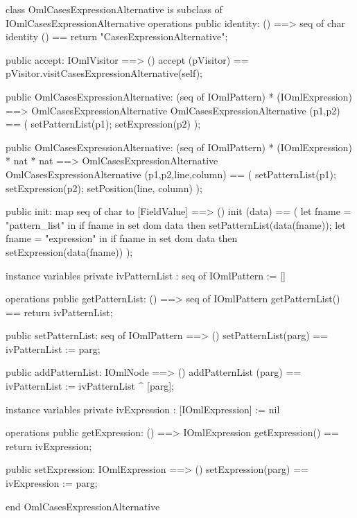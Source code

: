 \begin{vdm_al}
class OmlCasesExpressionAlternative is subclass of IOmlCasesExpressionAlternative
operations
  public identity: () ==> seq of char
  identity () == return "CasesExpressionAlternative";

  public accept: IOmlVisitor ==> ()
  accept (pVisitor) == pVisitor.visitCasesExpressionAlternative(self);

  public OmlCasesExpressionAlternative:
    (seq of IOmlPattern) *
    (IOmlExpression) ==> OmlCasesExpressionAlternative
  OmlCasesExpressionAlternative (p1,p2) == 
    ( setPatternList(p1);
      setExpression(p2) );

  public OmlCasesExpressionAlternative:
    (seq of IOmlPattern) *
    (IOmlExpression) *
    nat *
    nat ==> OmlCasesExpressionAlternative
  OmlCasesExpressionAlternative (p1,p2,line,column) == 
    ( setPatternList(p1);
      setExpression(p2);
      setPosition(line, column) );

  public init: map seq of char to [FieldValue] ==> ()
  init (data) ==
    ( let fname = "pattern_list" in
        if fname in set dom data
        then setPatternList(data(fname));
      let fname = "expression" in
        if fname in set dom data
        then setExpression(data(fname)) );

instance variables
  private ivPatternList : seq of IOmlPattern := []

operations
  public getPatternList: () ==> seq of IOmlPattern
  getPatternList() == return ivPatternList;

  public setPatternList: seq of IOmlPattern ==> ()
  setPatternList(parg) == ivPatternList := parg;

  public addPatternList: IOmlNode ==> ()
  addPatternList (parg) == ivPatternList := ivPatternList ^ [parg];

instance variables
  private ivExpression : [IOmlExpression] := nil

operations
  public getExpression: () ==> IOmlExpression
  getExpression() == return ivExpression;

  public setExpression: IOmlExpression ==> ()
  setExpression(parg) == ivExpression := parg;

end OmlCasesExpressionAlternative
\end{vdm_al}

